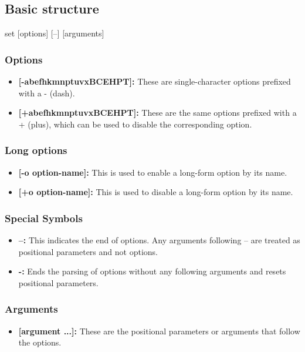 \documentclass{report}
\begin{document}
    \bigbreak \noindent 
    \subsection{Basic structure}
    \bigbreak \noindent 
    \begin{bashcode}
    set [options] [--] [arguments]
    \end{bashcode}
    \bigbreak \noindent 
    \subsubsection{Options}
    \bigbreak \noindent 
    \begin{itemize}
        \item \textbf{[-abefhkmnptuvxBCEHPT]:} These are single-character options prefixed with a - (dash).
        \item \textbf{[+abefhkmnptuvxBCEHPT]:} These are the same options prefixed with a + (plus), which can be used to disable the corresponding option.
    \end{itemize}
    \bigbreak \noindent 
    \subsubsection{Long options}
    \begin{itemize}
        \item \textbf{[-o option-name]:} This is used to enable a long-form option by its name.
        \item \textbf{[+o option-name]:} This is used to disable a long-form option by its name.
    \end{itemize}
    \bigbreak \noindent 
    \subsubsection{Special Symbols}
    \begin{itemize}
        \item \textbf{--:} This indicates the end of options. Any arguments following -- are treated as positional parameters and not options.
        \item \textbf{-:} Ends the parsing of options without any following arguments and resets positional parameters.
    \end{itemize}
    \bigbreak \noindent 
    \subsubsection{Arguments}
    \begin{itemize}
        \item \textbf{[argument ...]:} These are the positional parameters or arguments that follow the options.
    \end{itemize}
    \bigbreak \noindent 
\end{document}
